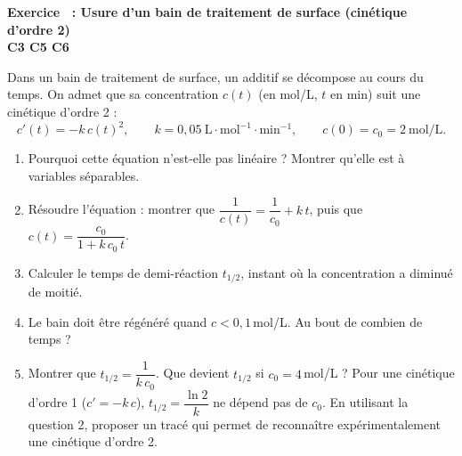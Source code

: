 \documentclass[a4paper,11pt]{article}
\newcounter{exo}
\newcommand{\exo}[4]{\needspace{0.5\textheight}\refstepcounter{exo}\label{exo:\theexo}\vspace{8pt}%
\begin{tcolorbox}[colback=uimmlightblue, colframe=uimmblue, boxrule=0.8pt, arc=2pt, left=6pt, right=6pt, top=3pt, bottom=3pt]
{\color{uimmblue}\bfseries Exercice \theexo\ : #1}\\
{\small\color{uimmred}\bfseries #2\quad #3}%
\if\relax\detokenize{#4}\relax\else\\{\footnotesize\color{uimmgray}\itshape #4}\fi
\end{tcolorbox}}
\newcommand{\rep}[1]{\par\noindent\begin{minipage}[t][#1cm]{\linewidth}\mbox{}\end{minipage}\par}
\begin{document}
\exo{Usure d'un bain de traitement de surface (cinétique d'ordre 2)}{C3 C5 C6}{[S01] [C01] [C02]}{}
Dans un bain de traitement de surface, un additif se décompose au cours du temps. On admet que sa concentration $c(t)$ (en mol/L, $t$ en min) suit une cinétique d'ordre 2 :
\[
c'(t) = -k\,c(t)^2, \qquad k = 0{,}05\ \text{L}\cdot\text{mol}^{-1}\cdot\text{min}^{-1}, \qquad c(0) = c_0 = 2\ \text{mol/L}.
\]
\begin{enumerate}
  \needspace{3.5cm}
  \item Pourquoi cette équation n'est-elle pas linéaire ? Montrer qu'elle est à variables séparables.
  \rep{2}
  \needspace{5cm}
  \item Résoudre l'équation : montrer que $\dfrac{1}{c(t)} = \dfrac{1}{c_0} + k\,t$, puis que $c(t) = \dfrac{c_0}{1 + k\,c_0\,t}$.
  \rep{3.5}
  \needspace{3.5cm}
  \item Calculer le temps de demi-réaction $t_{1/2}$, instant où la concentration a diminué de moitié.
  \rep{2}
  \needspace{3.5cm}
  \item Le bain doit être régénéré quand $c < 0{,}1$\,mol/L. Au bout de combien de temps ?
  \rep{2}
  \needspace{4.5cm}
  \item Montrer que $t_{1/2} = \dfrac{1}{k\,c_0}$. Que devient $t_{1/2}$ si $c_0 = 4$\,mol/L ? Pour une cinétique d'ordre 1 ($c' = -k\,c$), $t_{1/2} = \dfrac{\ln 2}{k}$ ne dépend pas de $c_0$. En utilisant la question 2, proposer un tracé qui permet de reconnaître expérimentalement une cinétique d'ordre 2.
  \rep{3.5}
\end{enumerate}
\end{document}
